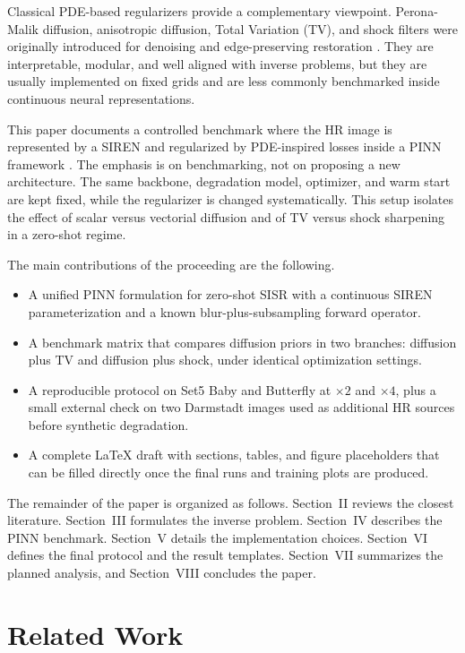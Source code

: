 \documentclass[conference]{IEEEtran}
\begin{document}
Classical PDE-based regularizers provide a complementary viewpoint.
Perona-Malik diffusion, anisotropic diffusion, Total Variation (TV),
and shock filters were originally introduced for denoising and
edge-preserving restoration \cite{peronamalik1990,weickert1998,rof1992,osherrudin1990}.
They are interpretable, modular, and well aligned with inverse
problems, but they are usually implemented on fixed grids and are less
commonly benchmarked inside continuous neural representations.

This paper documents a controlled benchmark where the HR image is
represented by a SIREN \cite{sitzmann2020siren} and regularized by
PDE-inspired losses inside a PINN framework \cite{raissi2019pinn}.
The emphasis is on benchmarking, not on proposing a new architecture.
The same backbone, degradation model, optimizer, and warm start are
kept fixed, while the regularizer is changed systematically. This
setup isolates the effect of scalar versus vectorial diffusion and of
TV versus shock sharpening in a zero-shot regime.

The main contributions of the proceeding are the following.
\begin{itemize}
\item A unified PINN formulation for zero-shot SISR with a continuous
      SIREN parameterization and a known blur-plus-subsampling forward
      operator.
\item A benchmark matrix that compares diffusion priors in two
      branches: diffusion plus TV and diffusion plus shock, under
      identical optimization settings.
\item A reproducible protocol on Set5 Baby and Butterfly at $\times 2$
      and $\times 4$, plus a small external check on two Darmstadt
      images used as additional HR sources before synthetic
      degradation.
\item A complete \LaTeX{} draft with sections, tables, and figure
      placeholders that can be filled directly once the final runs and
      training plots are produced.
\end{itemize}

The remainder of the paper is organized as follows. Section~II reviews
the closest literature. Section~III formulates the inverse problem.
Section~IV describes the PINN benchmark. Section~V details the
implementation choices. Section~VI defines the final protocol and the
result templates. Section~VII summarizes the planned analysis, and
Section~VIII concludes the paper.

\section{Related Work}
\end{document}
